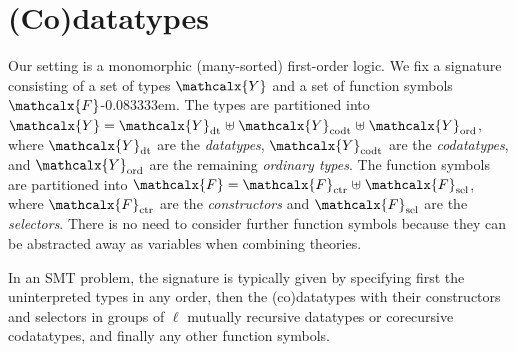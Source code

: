 \documentclass[letter]{article}
\theoremstyle{plain}
\theoremstyle{definition}
\newcommand\Sig{\mathrm{\Sigma}}
\newcommand\ty[1]{\textit{#1}}
\newcommand\Types{\mathcalx{Y}}
\newcommand\Funcs{\mathcalx{F}}
\newcommand\Data{\Types_{\mathrm{dt}}}
\newcommand\Codata{\Types_{\mathrm{codt}}}
\newcommand\Nondata{\Types_{\mathrm{ord}}}
\newcommand\Ctr{\Funcs_{\smash{\mathrm{ctr}}}}
\newcommand\Sel{\Funcs_{\smash{\mathrm{sel}}}}
\newcommand\vthinspace{\kern+0.083333em}
\newcommand\negvthinspace{\kern-0.083333em}
\begin{document}
\section{%
(Co)datatypes}
\label{sec:co-datatypes}

Our setting is a monomorphic (many-sorted) first-order logic.
We fix a signature %
consisting of a set of types $\Types$ and a
set of function symbols $\Funcs$\negvthinspace.
The types are partitioned into
$\Types = \Data \mathrel{\uplus} \Codata \mathrel{\uplus} \Nondata$, where $\Data$ are the
\emph{datatypes}, $\Codata$ are the \emph{codatatypes}, and $\Nondata$ are the remaining
\emph{ordinary types}.
The function symbols are
partitioned into $\Funcs = \Ctr \mathrel{\uplus} \Sel$, where $\Ctr$ are the
\emph{constructors} and $\Sel$ are the \emph{selectors}. There is no need to
consider further function symbols because they can be abstracted away as
variables when combining theories.

In an SMT problem, the signature is typically given by specifying first the
uninterpreted %
types in any order, then the (co)datatypes with their constructors
and selectors in groups of $\ell$ mutually recursive datatypes or corecursive
codatatypes, and
finally any other function symbols.


\newcommand\elll{\kern.0515ex \ell\kern.0515ex}
\newcommand\elllx{\kern.0515ex \ell\kern.0515ex}
\end{document}
